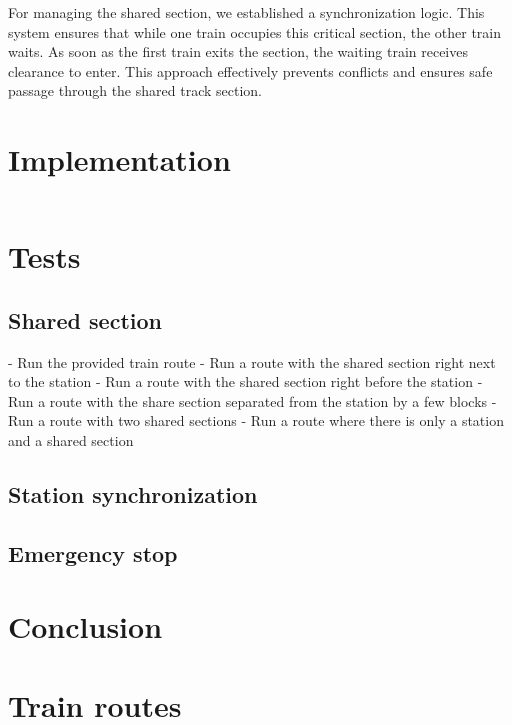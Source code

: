 \documentclass{article}
\begin{document}
For managing the shared section, we established a synchronization logic. This system ensures that while one train occupies this critical section, the other train waits. As soon as the first train exits the section, the waiting train receives clearance to enter. This approach effectively prevents conflicts and ensures safe passage through the shared track section.

    \section{Implementation}


    \begin{lstlisting}
    \end{lstlisting}


    \section{Tests}

    \subsection*{Shared section}
    - Run the provided train route
    - Run a route with the shared section right next to the station
    - Run a route with the shared section right before the station
    - Run a route with the share section separated from the station by a few blocks
    - Run a route with two shared sections
    - Run a route where there is only a station and a shared section

    \subsection*{Station synchronization}

    \subsection*{Emergency stop}

    \section{Conclusion}

    \appendix

    \section{Train routes}
\end{document}
